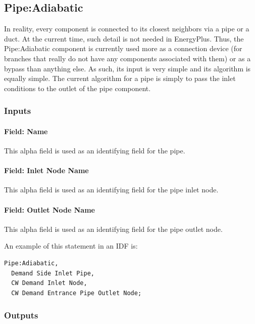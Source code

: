 \subsection{Pipe:Adiabatic}\label{pipeadiabatic}

In reality, every component is connected to its closest neighbors via a pipe or a duct. At the current time, such detail is not needed in EnergyPlus. Thus, the Pipe:Adiabatic component is currently used more as a connection device (for branches that really do not have any components associated with them) or as a bypass than anything else. As such, its input is very simple and its algorithm is equally simple. The current algorithm for a pipe is simply to pass the inlet conditions to the outlet of the pipe component.

\subsubsection{Inputs}\label{inputs-4-019}

\paragraph{Field: Name}\label{field-name-4-016}

This alpha field is used as an identifying field for the pipe.

\paragraph{Field: Inlet Node Name}\label{field-inlet-node-name-001}

This alpha field is used as an identifying field for the pipe inlet node.

\paragraph{Field: Outlet Node Name}\label{field-outlet-node-name-002}

This alpha field is used as an identifying field for the pipe outlet node.

An example of this statement in an IDF is:

\begin{lstlisting}
Pipe:Adiabatic,
  Demand Side Inlet Pipe,
  CW Demand Inlet Node,
  CW Demand Entrance Pipe Outlet Node;
\end{lstlisting}

\subsubsection{Outputs}\label{outputs-4-009}


